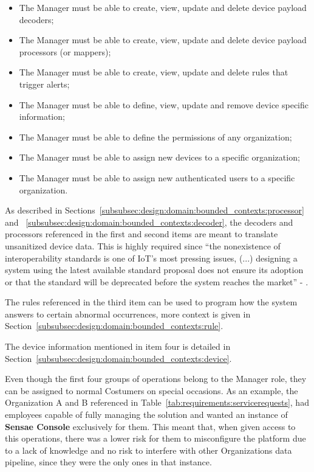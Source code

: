 \begin{itemize}
    \item The Manager must be able to create, view, update and delete device payload decoders;
    \item The Manager must be able to create, view, update and delete device payload processors (or mappers);
    \item The Manager must be able to create, view, update and delete rules that trigger alerts;
    \item The Manager must be able to define, view, update and remove device specific information;
    \item The Manager must be able to define the permissions of any organization;
    \item The Manager must be able to assign new devices to a specific organization;
    \item The Manager must be able to assign new authenticated users to a specific organization.
\end{itemize}

As described in Sections~\ref{subsubsec:design:domain:bounded_contexts:processor} and ~\ref{subsubsec:design:domain:bounded_contexts:decoder}, the decoders and processors referenced in the first and second items are meant to translate unsanitized device data. This is highly required since ``the nonexistence of interoperability standards is one of \gls{IoT}'s most pressing issues, (...) designing a system using the latest available standard proposal does not ensure its adoption or that the standard will be deprecated before the system reaches the market'' - \cite{DIAS2022100529}. 

The rules referenced in the third item can be used to program how the system answers to certain abnormal occurrences, more context is given in Section~\ref{subsubsec:design:domain:bounded_contexts:rule}.

The device information mentioned in item four is detailed in Section~\ref{subsubsec:design:domain:bounded_contexts:device}.

Even though the first four groups of operations belong to the Manager role, they can be assigned to normal Costumers on special occasions. As an example, the Organization A and B referenced in Table~\ref{tab:requirements:servicerequests}, had employees capable of fully managing the solution and wanted an instance of \textbf{Sensae Console} exclusively for them. This meant that, when given access to this operations, there was a lower risk for them to misconfigure the platform due to a lack of knowledge and no risk to interfere with other Organizations data pipeline, since they were the only ones in that instance.

